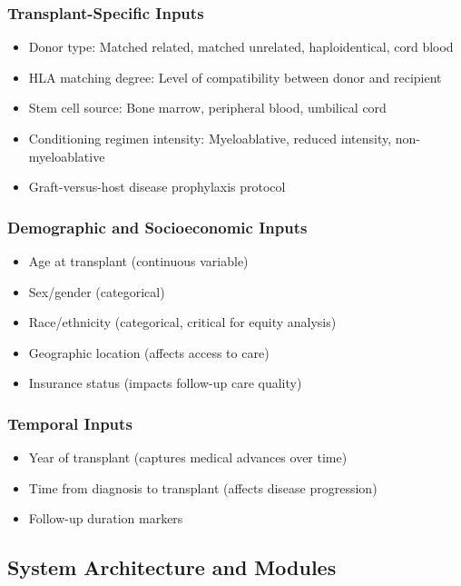 \subsubsection{Transplant-Specific Inputs}
\begin{itemize}
    \item Donor type: Matched related, matched unrelated, haploidentical, cord blood
    \item HLA matching degree: Level of compatibility between donor and recipient
    \item Stem cell source: Bone marrow, peripheral blood, umbilical cord
    \item Conditioning regimen intensity: Myeloablative, reduced intensity, non-myeloablative
    \item Graft-versus-host disease prophylaxis protocol
\end{itemize}

\subsubsection{Demographic and Socioeconomic Inputs}
\begin{itemize}
    \item Age at transplant (continuous variable)
    \item Sex/gender (categorical)
    \item Race/ethnicity (categorical, critical for equity analysis)
    \item Geographic location (affects access to care)
    \item Insurance status (impacts follow-up care quality)
\end{itemize}

\subsubsection{Temporal Inputs}
\begin{itemize}
    \item Year of transplant (captures medical advances over time)
    \item Time from diagnosis to transplant (affects disease progression)
    \item Follow-up duration markers
\end{itemize}

\subsection{System Architecture and Modules}

